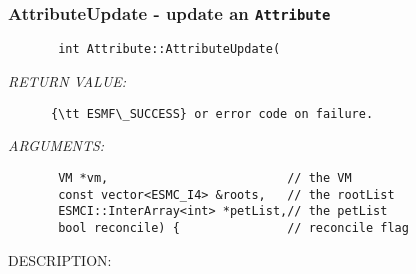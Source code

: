  
\setlength{\oldparskip}{\parskip}
\setlength{\parskip}{1.5ex}
\setlength{\oldparindent}{\parindent}
\setlength{\parindent}{0pt}
\setlength{\oldbaselineskip}{\baselineskip}
\setlength{\baselineskip}{11pt}
 
\def\bv{\begin{verbatim}}
\def\ev{\end{verbatim}}
\def\be{\begin{equation}}
\def\ee{\end{equation}}
\def\bea{\begin{eqnarray}}
\def\eea{\end{eqnarray}}
\def\bi{\begin{itemize}}
\def\ei{\end{itemize}}
\def\bn{\begin{enumerate}}
\def\en{\end{enumerate}}
\def\bd{\begin{description}}
\def\ed{\end{description}}
\def\({\left (}
\def\){\right )}
\def\[{\left [}
\def\]{\right ]}
\def\<{\left  \langle}
\def\>{\right \rangle}
\def\cI{{\cal I}}
\def\diag{\mathop{\rm diag}}
\def\tr{\mathop{\rm tr}}


 

  
 
\mbox{}\hrulefill\
 
\subsubsection [AttributeUpdate] {AttributeUpdate - update an {\tt Attribute}}


  
\begin{verbatim}       int Attribute::AttributeUpdate(\end{verbatim}{\em RETURN VALUE:}
\begin{verbatim}      {\tt ESMF\_SUCCESS} or error code on failure.\end{verbatim}{\em ARGUMENTS:}
\begin{verbatim}       VM *vm,                         // the VM
       const vector<ESMC_I4> &roots,   // the rootList
       ESMCI::InterArray<int> *petList,// the petList
       bool reconcile) {               // reconcile flag\end{verbatim}
{\sf DESCRIPTION:\\ }


